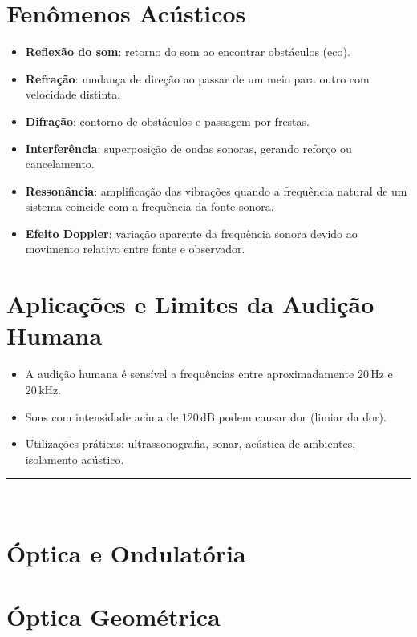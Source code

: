 \documentclass[a4paper,12pt]{article}
\begin{document}
\begin{multicols}{2}
\section{Fenômenos Acústicos}
\begin{itemize}
    \item \textbf{Reflexão do som}: retorno do som ao encontrar obstáculos (eco).
    \item \textbf{Refração}: mudança de direção ao passar de um meio para outro com velocidade distinta.
    \item \textbf{Difração}: contorno de obstáculos e passagem por frestas.
    \item \textbf{Interferência}: superposição de ondas sonoras, gerando reforço ou cancelamento.
    \item \textbf{Ressonância}: amplificação das vibrações quando a frequência natural de um sistema coincide com a frequência da fonte sonora.
    \item \textbf{Efeito Doppler}: variação aparente da frequência sonora devido ao movimento relativo entre fonte e observador.
\end{itemize}

\section{Aplicações e Limites da Audição Humana}
\begin{itemize}
    \item A audição humana é sensível a frequências entre aproximadamente $20\,\text{Hz}$ e $20\,\text{kHz}$.
    \item Sons com intensidade acima de $120\,\text{dB}$ podem causar dor (limiar da dor).
    \item Utilizações práticas: ultrassonografia, sonar, acústica de ambientes, isolamento acústico.
\end{itemize}

\noindent\rule{\linewidth}{1pt}\\

\section{Óptica e Ondulatória}

\section{Óptica Geométrica}


\end{multicols}
\end{document}
